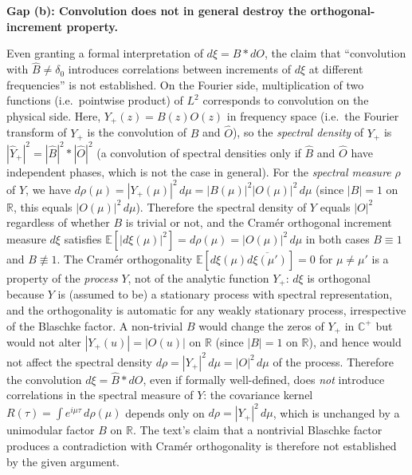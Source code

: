 \documentclass[11pt]{article}
\newcommand{\R}{\mathbb{R}}
\newcommand{\C}{\mathbb{C}}
\begin{document}
\begin{description}[leftmargin=0pt]
\smallskip
\noindent\textbf{Gap (b): Convolution does not in general destroy the
orthogonal-increment property.}

Even granting a formal interpretation of $d\xi=\hat B\ast dO$, the claim that
``convolution with $\hat B\ne\delta_0$ introduces correlations between increments
of $d\xi$ at different frequencies'' is not established.
On the Fourier side, multiplication of two functions (i.e.\ pointwise product) of
$L^2$ corresponds to convolution on the physical side.
Here, $Y_+(z)=B(z)O(z)$ in frequency space (i.e.\ the Fourier transform of $Y_+$
is the convolution of $\hat B$ and $\hat O$), so the \emph{spectral density} of
$Y_+$ is $|\hat Y_+|^2=|\hat B|^2*|\hat O|^2$ (a convolution of spectral densities
only if $\hat B$ and $\hat O$ have independent phases, which is not the case in
general).
For the \emph{spectral measure} $\rho$ of $Y$, we have
$d\rho(\mu)=|Y_+(\mu)|^2\,d\mu=|B(\mu)|^2|O(\mu)|^2\,d\mu$ (since $|B|=1$ on
$\R$, this equals $|O(\mu)|^2\,d\mu$).
Therefore the spectral density of $Y$ equals $|O|^2$ regardless of whether $B$ is
trivial or not, and the Cram\'{e}r orthogonal increment measure $d\xi$ satisfies
$\mathbb{E}[|d\xi(\mu)|^2]=d\rho(\mu)=|O(\mu)|^2\,d\mu$ in both cases $B\equiv 1$
and $B\not\equiv 1$.
The Cram\'{e}r orthogonality $\mathbb{E}[d\xi(\mu)\overline{d\xi(\mu')}]=0$ for
$\mu\ne\mu'$ is a property of the \emph{process} $Y$, not of the analytic
function $Y_+$:
$d\xi$ is orthogonal because $Y$ is (assumed to be) a stationary process with
spectral representation, and the orthogonality is automatic for any weakly
stationary process, irrespective of the Blaschke factor.
A non-trivial $B$ would change the zeros of $Y_+$ in $\C^+$ but would not alter
$|Y_+(u)|=|O(u)|$ on $\R$ (since $|B|=1$ on $\R$), and hence would not affect the
spectral density $d\rho=|Y_+|^2\,d\mu=|O|^2\,d\mu$ of the process.
Therefore the convolution $d\xi=\hat B\ast dO$, even if formally well-defined,
does \emph{not} introduce correlations in the spectral measure of $Y$:
the covariance kernel $R(\tau)=\int e^{i\mu\tau}\,d\rho(\mu)$ depends only on
$d\rho=|Y_+|^2\,d\mu$, which is unchanged by a unimodular factor $B$ on $\R$.
The text's claim that a nontrivial Blaschke factor produces a contradiction with
Cram\'{e}r orthogonality is therefore not established by the given argument.


\end{description}
\end{document}
